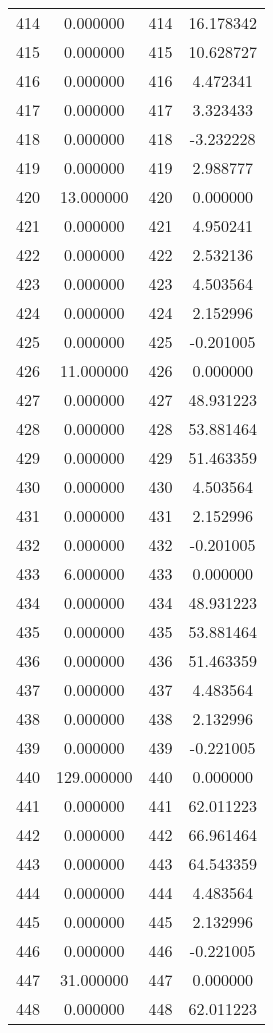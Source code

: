 \documentclass[12pt]{article}
\begin{document}
\begin{longtable}{@{}cccc@{}}
414 & 0.000000 & 414 & 16.178342 \\
415 & 0.000000 & 415 & 10.628727 \\
416 & 0.000000 & 416 & 4.472341 \\
417 & 0.000000 & 417 & 3.323433 \\
418 & 0.000000 & 418 & -3.232228 \\
419 & 0.000000 & 419 & 2.988777 \\
420 & 13.000000 & 420 & 0.000000 \\
421 & 0.000000 & 421 & 4.950241 \\
422 & 0.000000 & 422 & 2.532136 \\
423 & 0.000000 & 423 & 4.503564 \\
424 & 0.000000 & 424 & 2.152996 \\
425 & 0.000000 & 425 & -0.201005 \\
426 & 11.000000 & 426 & 0.000000 \\
427 & 0.000000 & 427 & 48.931223 \\
428 & 0.000000 & 428 & 53.881464 \\
429 & 0.000000 & 429 & 51.463359 \\
430 & 0.000000 & 430 & 4.503564 \\
431 & 0.000000 & 431 & 2.152996 \\
432 & 0.000000 & 432 & -0.201005 \\
433 & 6.000000 & 433 & 0.000000 \\
434 & 0.000000 & 434 & 48.931223 \\
435 & 0.000000 & 435 & 53.881464 \\
436 & 0.000000 & 436 & 51.463359 \\
437 & 0.000000 & 437 & 4.483564 \\
438 & 0.000000 & 438 & 2.132996 \\
439 & 0.000000 & 439 & -0.221005 \\
440 & 129.000000 & 440 & 0.000000 \\
441 & 0.000000 & 441 & 62.011223 \\
442 & 0.000000 & 442 & 66.961464 \\
443 & 0.000000 & 443 & 64.543359 \\
444 & 0.000000 & 444 & 4.483564 \\
445 & 0.000000 & 445 & 2.132996 \\
446 & 0.000000 & 446 & -0.221005 \\
447 & 31.000000 & 447 & 0.000000 \\
448 & 0.000000 & 448 & 62.011223 \\

\end{longtable}
\end{document}
